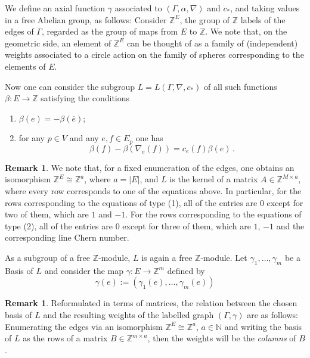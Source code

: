 \documentclass[12pt,a4paper]{amsart}
\newcommand{\ZZ}{\mathbb{Z}}
\newcommand{\NN}{\mathbb{N}}
\theoremstyle{plain}
\theoremstyle{definition}
\newtheorem{rem}[thm]{Remark}
\begin{document}
We define an axial function $\gamma$ associated to $(\Gamma,\alpha,\nabla)$ and $c_*$, and taking values in a free Abelian group, as follows: Consider $\ZZ^{E}$, the group of $\ZZ$ labels of the edges of $\Gamma$, regarded as the group of maps from $E$ to $\ZZ$. We note that, on the geometric side, an element of $\ZZ^{E}$ 
can be thought of as a family of (independent) weights associated to a circle action on the family of spheres corresponding to the elements of $E$. 

Now one can consider the subgroup $L=L(\Gamma,\nabla, c_*)$ of all such functions $\beta\colon E\rightarrow \ZZ$ satisfying the conditions
\begin{enumerate}
\item $\beta(e)=-\beta(\overline{e})$;
\item for any $p\in V$ and any $e,f\in E_p$ one has $$\beta(f)- \beta(\nabla_e(f))=c_e(f)\beta(e)\,.$$
\end{enumerate}

\begin{rem}\label{rem: system of eq}
We note that, for a fixed enumeration of the edges, one obtains an isomorphism $\ZZ^{E}\cong \ZZ^a$, where $a=|E|$, and $L$ is the kernel of a matrix $A\in \ZZ^{M\times a}$, where every row corresponds to one of the equations above. In particular,
for the rows corresponding to the equations of type (1), all of the entries are 0 except for two of them, which are $1$ and $-1$. For the rows
corresponding to the equations of type (2), all of the entries are 0 except for three of
them, which are $1$, $-1$ and the corresponding line Chern number.
\end{rem}


As a subgroup of a free $\ZZ$-module, $L$ is again a free $\ZZ$-module. Let $\gamma_1,\ldots,\gamma_m$ be a Basis of $L$ and consider the map $\gamma\colon E\rightarrow \ZZ^m$ defined by
\[\gamma(e):=(\gamma_1(e),\ldots,\gamma_m(e))\]
\begin{rem}\label{rem: transpose business}
Reformulated in terms of matrices, the relation between the chosen basis of $L$ and the resulting weights of the labelled graph $(\Gamma,\gamma)$ are as follows: Enumerating the edges via an isomorphism $\ZZ^E\cong \ZZ^a$, $a\in \NN$ and writing the basis of $L$ as the rows of a matrix $B\in \ZZ^{m\times a}$, then the weights will be the \emph{columns} of $B$.
\end{rem}
\end{document}
